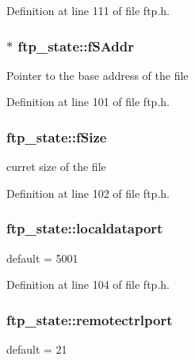 Definition at line 111 of file ftp.h.

\hypertarget{group__ftp_gac0c7f95f2f266647b5977451d83be1e3}{
\subsubsection[{fSAddr}]{$\ast$ {\bf ftp\_\-state::fSAddr}}}
\label{group__ftp_gac0c7f95f2f266647b5977451d83be1e3}
Pointer to the base address of the file 

Definition at line 101 of file ftp.h.

\hypertarget{group__ftp_ga7f29a23ccdd3a4c3ba2208d6392eb452}{
\subsubsection[{fSize}]{ {\bf ftp\_\-state::fSize}}}
\label{group__ftp_ga7f29a23ccdd3a4c3ba2208d6392eb452}
curret size of the file 

Definition at line 102 of file ftp.h.

\hypertarget{group__ftp_ga66a09edc48c8850976a82d1cbe55a54b}{
\subsubsection[{localdataport}]{ {\bf ftp\_\-state::localdataport}}}
\label{group__ftp_ga66a09edc48c8850976a82d1cbe55a54b}
default = 5001 

Definition at line 104 of file ftp.h.

\hypertarget{group__ftp_gad9ad023f58a17a9adc147882890aa84c}{
\subsubsection[{remotectrlport}]{ {\bf ftp\_\-state::remotectrlport}}}
\label{group__ftp_gad9ad023f58a17a9adc147882890aa84c}
default = 21 


